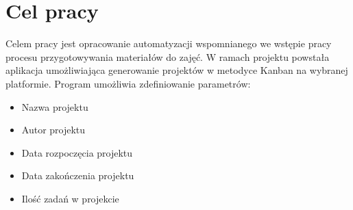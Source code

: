 \section{Cel pracy}
Celem pracy jest opracowanie automatyzacji wspomnianego we wstępie pracy procesu przygotowywania materiałów do zajęć.
W ramach projektu powstała aplikacja umożliwiająca generowanie projektów w metodyce Kanban na wybranej platformie.
Program umożliwia zdefiniowanie parametrów:
\begin{itemize}
    \item Nazwa projektu
    \item Autor projektu
    \item Data rozpoczęcia projektu
    \item Data zakończenia projektu
    \item Ilość zadań w projekcie
\end{itemize}
